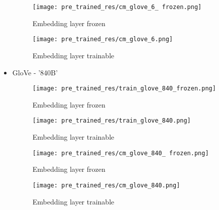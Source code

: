 \documentclass{article}
\begin{document}
\begin{itemize}
\begin{figure}[H]
\begin{minipage}{.5\textwidth}
    \end{minipage}
    \end{figure}
        \begin{figure}[H]
    \centering
    \begin{minipage}{.5\linewidth}
        \centering
        \texttt{[image: pre\_trained\_res/cm\_glove\_6\_ frozen.png]}
        \vspace{-2.2em}
        \caption{Embedding layer frozen}

    \end{minipage}%
    \begin{minipage}{.5\textwidth}
      \centering
      \texttt{[image: pre\_trained\_res/cm\_glove\_6.png]}
      \vspace{-2.2em}
      \caption{Embedding layer trainable}

    \end{minipage}
    \end{figure}
    
    \item GloVe - '840B'
    \begin{figure}[H]
    \centering
    \begin{minipage}{.5\linewidth}
        \centering
        \texttt{[image: pre\_trained\_res/train\_glove\_840\_frozen.png]}
        \vspace{-1.0em}
        \caption{Embedding layer frozen}

    \end{minipage}%
    \begin{minipage}{.5\textwidth}
      \centering
      \texttt{[image: pre\_trained\_res/train\_glove\_840.png]}
      \vspace{-1.0em}
      \caption{Embedding layer trainable}

    \end{minipage}
    \end{figure}
        \begin{figure}[H]
    \centering
    \begin{minipage}{.5\linewidth}
        \centering
        \texttt{[image: pre\_trained\_res/cm\_glove\_840\_ frozen.png]}
        \vspace{-2.2em}
        \caption{Embedding layer frozen}

    \end{minipage}%
    \begin{minipage}{.5\textwidth}
      \centering
      \texttt{[image: pre\_trained\_res/cm\_glove\_840.png]}
      \vspace{-2.2em}
      \caption{Embedding layer trainable}


\end{minipage}
\end{figure}
\end{itemize}
\end{document}
